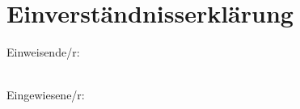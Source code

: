 \section{Einverständnisserklärung}
Einweisende/r:\\
\begin{Form}
\end{Form}
\leavevmode
~\\
Eingewiesene/r:\\
\begin{Form}
\end{Form}
